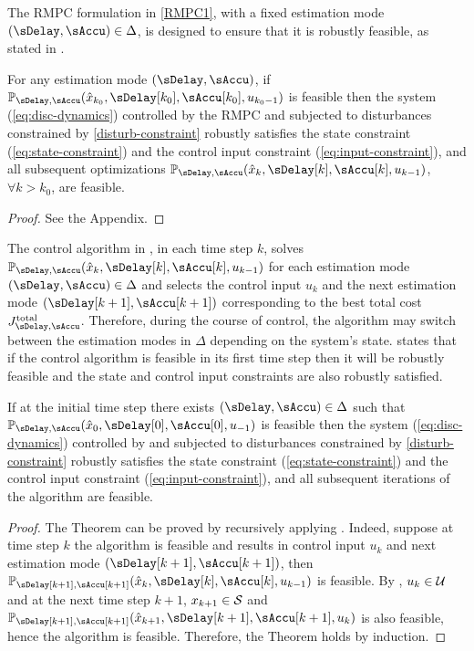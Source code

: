 The RMPC formulation in \eqref{RMPC1}, with a fixed estimation mode
$\left(\sDelay,\sAccu\right)\in\Delta$, is designed to ensure that
it is robustly feasible, as stated in .
\begin{theorem}
\label{thm:robust-feasible-RMPC} For
any estimation mode $\left(\sDelay,\sAccu\right)$, if $\MPCProb{\sDelay,\sAccu}(\hat{x}_{k_{0}},\sDelay[k_{0}],\sAccu[k_{0}],u_{k_{0}-1})$
is feasible then the system (\ref{eq:disc-dynamics}) controlled by
the RMPC and subjected to disturbances constrained by \eqref{disturb-constraint}
robustly satisfies the state constraint (\ref{eq:state-constraint})
and the control input constraint (\ref{eq:input-constraint}), and
all subsequent optimizations $\MPCProb{\sDelay,\sAccu}(\hat{x}_{k},\sDelay[k],\sAccu[k],u_{k-1})$,
$\forall k>k_{0}$, are feasible.
\end{theorem}
\begin{proof}
See the Appendix.
\end{proof}
The control algorithm in , in each time step $k$, solves $\MPCProb{\sDelay,\sAccu}(\hat{x}_{k},\sDelay[k],\sAccu[k],u_{k-1})$ for each estimation mode $\left(\sDelay,\sAccu\right)\in\Delta$ and selects the control input $u_{k}$ and the next estimation mode $\left(\sDelay[k+1],\sAccu[k+1]\right)$
corresponding to the best total cost $J_{\sDelay,\sAccu}^{\mathrm{total}}$.
Therefore, during the course of control, the algorithm may switch between the estimation modes in $\Delta$ depending on the system's state.  states that if the control algorithm  is feasible in its first time step then it will be robustly feasible and the state and control input constraints are also robustly satisfied.
\begin{theorem}%
\label{thm:robust-feasible-anytime-RMPC}
If at the initial time step there exists $\left(\sDelay,\sAccu\right)\in\Delta$
such that $\MPCProb{\sDelay,\sAccu}(\hat{x}_{0},\sDelay[0],\sAccu[0],u_{-1})$
is feasible then the system (\ref{eq:disc-dynamics}) controlled by
 and subjected to disturbances constrained
by \eqref{disturb-constraint} robustly satisfies the state constraint
(\ref{eq:state-constraint}) and the control input constraint (\ref{eq:input-constraint}),
and all subsequent iterations of the algorithm are feasible.
\end{theorem}
\begin{proof}
The Theorem can be proved by recursively applying .
Indeed, suppose at time step $k$ the algorithm
is feasible and results in control input $u_{k}$ and next estimation
mode $\left(\sDelay[k+1],\sAccu[k+1]\right)$, then $\MPCProb{\sDelay[k+1],\sAccu[k+1]}(\hat{x}_{k},\sDelay[k],\sAccu[k],u_{k-1})$
is feasible. By , $u_{k}\in\mathcal{U}$ and
at the next time step $k+1$, $x_{k+1}\in\mathcal{S}$ and $\MPCProb{\sDelay[k+1],\sAccu[k+1]}(\hat{x}_{k+1},\sDelay[k+1],\sAccu[k+1],u_{k})$
is also feasible, hence the algorithm is feasible.
Therefore, the Theorem holds by induction.
\end{proof}


